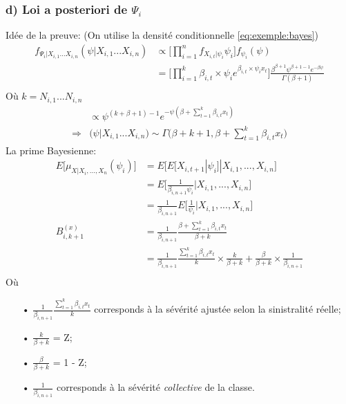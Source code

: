 \documentclass[11pt,french]{report}
\begin{document}
\subsubsection*{d) Loi a posteriori de $\Psi_i$}
Idée de la preuve: (On utilise la densité conditionnelle \ref{eq:exemple:bayes})
\begin{align*}
f_{\Psi_i|X_{i,1}...X_{i,n}}(\psi|X_{i,1}...X_{i,n}) &\propto \Bigg[\prod_{i=1}^{n} f_{X_{i,t}|\psi_i}\psi_i\Bigg] f_{\psi_i}(\psi) \\
&= \Bigg[\prod_{i=1}^{k} \beta _{i,t} \times \psi_i e^{\beta _{i,t} \times \psi_i x_t} \Bigg] \frac{\beta^{\beta+1} \psi^{\beta + 1 -1} e^{-\beta \psi}}{\Gamma(\beta + 1)} \\
\end{align*}
Où $k = N_{i,1}...N_{i,n}$
\begin{align*}
& \propto \psi^{(k+\beta + 1)-1} e^{-\psi(\beta + \sum_{t=1}^{k}\beta_{i,t} x_t)} \\
\Rightarrow& \Big( \psi|X_{i,1}...X_{i,n}\Big) \sim \Gamma\Big(\beta + k + 1, \beta + \sum_{t=1}^{k}\beta_{i,t} x_t \Big) 
\end{align*}
La prime Bayesienne:
\begin{align*}
E\Big[\mu_{X|X_i,...,X_n}(\psi_i) \Big] &= E\Big[E\big[X_{i,t+1}|\psi_i\big]|X_{i,1},...,X_{i,n} \Big]\\
&= E\Bigg[\frac{1}{\beta_{i,n+1}\psi_i}|X_{i,1},...,X_{i,n} \Bigg]\\
&= \frac{1}{\beta_{i,n+1}}E\Bigg[\frac{1}{\psi_i}|X_{i,1},...,X_{i,n} \Bigg]\\
B_{i,k+1}^{(x)} &= \frac{1}{\beta_{i,n+1}}\frac{\beta + \sum_{t=1}^{k}\beta_{i,t} x_t}{\beta + k}\\
&= \frac{1}{\beta_{i,n+1}}\frac{\sum_{t=1}^{k}\beta_{i,t} x_t}{k} \times \frac{k}{\beta + k} + \frac{\beta}{\beta + k} \times \frac{1}{\beta_{i,n+1}}\\
\end{align*}
Où 
\begin{itemize}
\item[•] $\frac{1}{\beta_{i,n+1}}\frac{\sum_{t=1}^{k}\beta_{i,t} x_t}{k}$ corresponds à la sévérité ajustée selon la sinistralité réelle;
\item[•] $\frac{k}{\beta + k}$ = Z;
\item[•] $\frac{\beta}{\beta + k}$ = 1 - Z;
\item[•] $\frac{1}{\beta_{i,n+1}} $ corresponds à la sévérité \textit{collective} de la classe.
\end{itemize}
\end{document}

